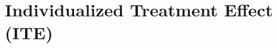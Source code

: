 % 
% 
% 

















\section{Individualized Treatment Effect (ITE)} \label{sec:methods_ite}



